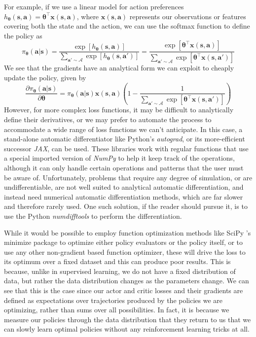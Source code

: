 \documentclass{article}
\begin{document}
For example, if we use a linear model for action preferences $h_{\boldsymbol{\theta}}(\mathbf{s},\mathbf{a})=\boldsymbol{\theta}^\top\mathbf{x}(\mathbf{s},\mathbf{a})$, where $\mathbf{x}(\mathbf{s},\mathbf{a})$ represents our observations or features covering both the state and the action, we can use the softmax function to define the policy as \begin{equation}\pi_{\boldsymbol{\theta}}(\mathbf{a}|\mathbf{s})=\frac{\exp[h_{\boldsymbol{\theta}}(\mathbf{s},\mathbf{a})]}{\sum_{\mathbf{a}'\sim\mathcal{A}}\exp[h_{\boldsymbol{\theta}}(\mathbf{s},\mathbf{a}')]}=\frac{\exp[\boldsymbol{\theta}^\top\mathbf{x}(\mathbf{s},\mathbf{a})]}{\sum_{\mathbf{a}'\sim\mathcal{A}}\exp[\boldsymbol{\theta}^\top\mathbf{x}(\mathbf{s},\mathbf{a}')]}\end{equation}We see that the gradients have an analytical form we can exploit to cheaply update the policy, given by \begin{equation}\frac{\partial \pi_{\boldsymbol{\theta}}(\mathbf{a}|\mathbf{s})}{\partial \boldsymbol{\theta}}=\pi_{\boldsymbol{\theta}}(\mathbf{a}|\mathbf{s})\mathbf{x}(\mathbf{s},\mathbf{a})\left(1-\frac{1}{\sum_{\mathbf{a}'\sim\mathcal{A}}\exp[\boldsymbol{\theta}^\top\mathbf{x}(\mathbf{s},\mathbf{a}')]}\right)\end{equation}
However, for more complex loss functions, it may be difficult to analytically define their derivatives, or we may prefer to automate the process to accommodate a wide range of loss functions we can't anticipate. In this case, a stand-alone automatic differentiator like Python's \textit{autograd}, or its more-efficient successor \textit{JAX}, can be used. These libraries work with regular functions that use a special imported version of \textit{NumPy} to help it keep track of the operations, although it can only handle certain operations and patterns that the user must be aware of. Unfortunately, problems that require any degree of simulation, or are undifferentiable, are not well suited to analytical automatic differentiation, and instead need numerical automatic differentiation methods, which are far slower and therefore rarely used. One such solution, if the reader should pursue it, is to use the Python \textit{numdifftools} to perform the differentiation.

While it would be possible to employ function optimization methods like SciPy 's minimize package to optimize either policy evaluators or the policy itself, or to use any other non-gradient based function optimizer, these will drive the loss to its optimum over a fixed dataset and this can produce poor results. This is because, unlike in supervised learning, we do not have a fixed distribution of data, but rather the data distribution changes as the parameters change. We can see that this is the case since our actor and critic losses and their gradients are defined as expectations over trajectories produced by the policies we are optimizing, rather than sums over all possibilities. In fact, it is because we measure our policies through the data distribution that they return to us that we can slowly learn optimal policies without any reinforcement learning tricks at all. 
\end{document}
